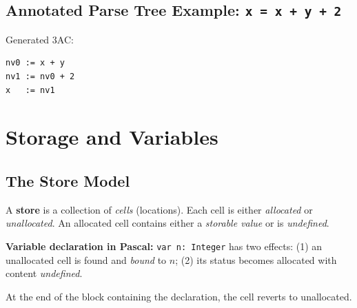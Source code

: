 \documentclass[12pt,a4paper]{article}
\begin{document}
\subsection{Annotated Parse Tree Example: \texttt{x = x + y + 2}}

\begin{center}
\end{center}

Generated 3AC:
\begin{verbatim}
nv0 := x + y
nv1 := nv0 + 2
x   := nv1
\end{verbatim}

\section{Storage and Variables}

\subsection{The Store Model}

A \textbf{store} is a collection of \emph{cells} (locations).
Each cell is either \emph{allocated} or \emph{unallocated}.
An allocated cell contains either a \emph{storable value} or is \emph{undefined}.

\textbf{Variable declaration in Pascal:}
\texttt{var n: Integer} has two effects:
(1) an unallocated cell is found and \emph{bound} to $n$;
(2) its status becomes allocated with content \emph{undefined}.

At the end of the block containing the declaration, the cell reverts to unallocated.
\end{document}
